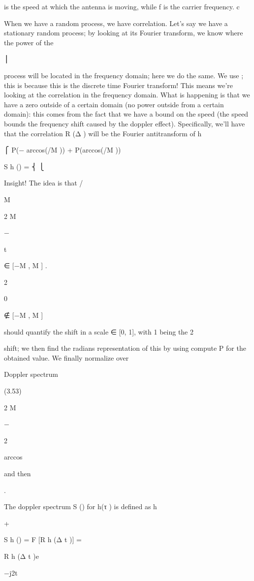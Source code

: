 {{{{is the speed at which the antenna is moving, while f is the carrier frequency.
c

When we have a random process, we have correlation. Let's say we have a stationary random process; by looking at its Fourier transform, we know where the power of the

⎪

process will be located in the frequency domain; here we do the same. We use \nu ; this is because this is the discrete time Fourier transform! This means we're looking at the correlation in the frequency domain. What is happening is that we have a zero outside of a certain domain (no power outside from a certain domain): this comes from the fact that we have a bound on the speed (the speed bounds the frequency shift caused by the doppler effect). Specifically, we'll have that the correlation R (Δ ) will be the Fourier antitransform of h

⎧ P(− arccos(\nu/\nu M )) + P(arccos(\nu/\nu M ))

S h (\nu) = ⎨
⎩

​Insight!
The idea is that \nu/\nu

M

\sqrt\nu

2 M

− \nu

t

\nu ∈ [−\nu M , \nu M ]
.

2

0

\nu ∉ [−\nu M , \nu M ]

should quantify the shift in a scale ∈ [0, 1], with 1 being the 2\pi

shift; we then find the radians representation of this by using compute P for the obtained value. We finally normalize over \sqrt\nu

Doppler spectrum

(3.53)

2 M

− \nu

2

arccos

and then

.

The doppler spectrum S (\nu) for h(τ ) is defined as h

+\infty

S h (\nu) = F [R h (Δ t )] = \int

R h (Δ t )e

−j2\pi{} t

}}}}
